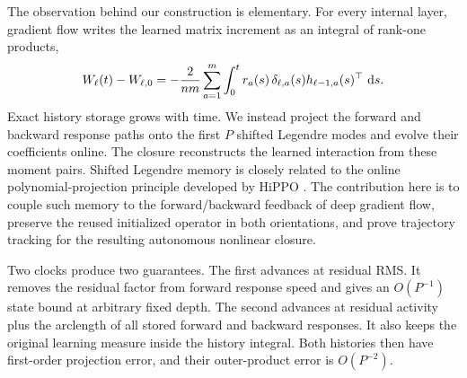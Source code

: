The observation behind our construction is elementary.  For every internal
layer, gradient flow writes the learned matrix increment as an integral of
rank-one products,
\begin{equation}
 W_\ell(t)-W_{\ell,0}
 =-\frac{2}{nm}\sum_{a=1}^{m}\int_0^t
 r_a(s)\,\delta_{\ell,a}(s)h_{\ell-1,a}(s)^\top\,\mathop{}\!\mathrm d s .
 \label{eq:intro-history}
\end{equation}
Exact history storage grows with time.  We instead project the forward and
backward response paths onto the first $P$ shifted Legendre modes and evolve
their coefficients online.  The closure reconstructs the learned interaction
from these moment pairs.  Shifted Legendre memory is closely related to the
online polynomial-projection principle developed by HiPPO
\citep{gu2020hippo}.  The contribution here is to couple such memory to the
forward/backward feedback of deep gradient flow, preserve the reused
initialized operator in both orientations, and prove trajectory tracking for
the resulting autonomous nonlinear closure.

Two clocks produce two guarantees.  The first advances at residual RMS.  It
removes the residual factor from forward response speed and gives an
$O(P^{-1})$ state bound at arbitrary fixed depth.  The second advances at
residual activity plus the arclength of all stored forward and backward
responses.  It also keeps the original learning measure inside the history
integral.  Both histories then have first-order projection error, and their
outer-product error is $O(P^{-2})$.

